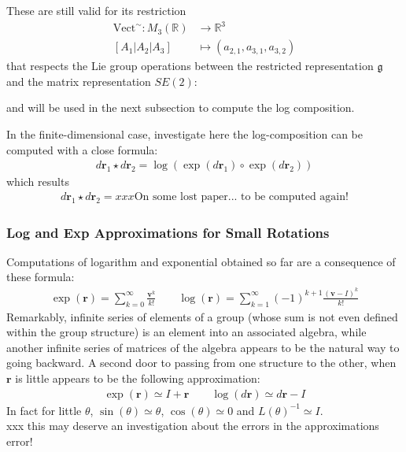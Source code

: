 These are still valid for its restriction 
\begin{align*}
\text{Vect}^{\sim} : M_{3}(\mathbb{R}) & \longrightarrow \mathbb{R}^{3}\\
[A_1 \big| A_2  \big| A_3]
&\longmapsto  
(a_{2,1}, a_{3,1}, a_{3,2})
\end{align*}
that respects the Lie group operations between the restricted representation $\mathfrak{g}$ and the matrix representation $SE(2)$:


and will be used in the next subsection to compute the log composition.













In the finite-dimensional case, investigate here the log-composition can be computed with a close formula:
\begin{align*}
d\mathbf{r}_{1}\star d\mathbf{r}_{2} =  \log(\exp(d\mathbf{r}_1)\circ \exp(d\mathbf{r}_2)) 
\end{align*}
which results
\begin{align*}
d\mathbf{r}_{1}\star d\mathbf{r}_{2} 
= 
xxx \text{On some lost paper... to be computed again!}
\end{align*}




\subsubsection{Log and Exp Approximations for Small Rotations}
Computations of logarithm and exponential obtained so far are a consequence of these formula:
\begin{align*}
\exp(\mathbf{r}) = \sum_{k=0}^{\infty} \frac{\mathbf{v}^{k}}{k!}
\qquad 
\log(\mathbf{r}) = \sum_{k=1}^{\infty}(-1)^{k+1} \frac{(\mathbf{v}-I)^{k} }{k!}
\end{align*}
Remarkably, infinite series of elements of a group (whose sum is not even defined within the group structure) is an element into an associated algebra, while another infinite series of matrices of the algebra appears to be the natural way to going backward. A second door to passing from one structure to the other, when $\mathbf{r}$ is little appears to be the following approximation:
\begin{align*}
\exp(\mathbf{r}) \simeq I + \mathbf{r} 
\qquad 
\log(d\mathbf{r}) \simeq d\mathbf{r} - I
\end{align*}
In fact for little $\theta$, $\sin(\theta) \simeq \theta$, $\cos(\theta) \simeq 0 $ and $ L(\theta)^{-1} \simeq I$. \\
xxx this may deserve an investigation about the errors in the approximations error!




